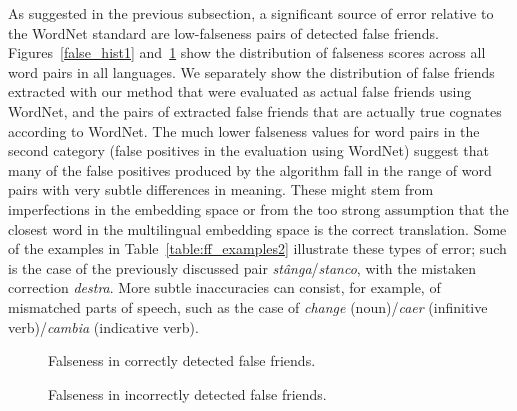\documentclass[output=paper]{langsci/langscibook}
\begin{document}
As suggested in the previous subsection, a significant source of error relative to the WordNet standard are low-falseness pairs of detected false friends.
Figures~\ref{false_hist1} and~\ref{false_hist2} show the distribution of falseness scores across all word pairs in all languages. We separately show the distribution of false friends extracted with our method that were evaluated as actual false friends using WordNet, and the pairs of extracted false friends that are actually true cognates according to WordNet. The much lower falseness values for word pairs in the second category (false positives in the evaluation using WordNet) suggest that many of the false positives produced by the algorithm fall in the range of word pairs with very subtle differences in meaning. These might stem from imperfections in the embedding space or from the too strong assumption that the closest word in the multilingual embedding space is the correct translation. Some of the examples in Table~\ref{table:ff_examples2} illustrate these types of error; such is the case of the previously discussed pair \textit{stânga}\slash\textit{stanco}, with the mistaken correction \textit{destra}. More subtle inaccuracies can consist, for example, of mismatched parts of speech, such as the case of \textit{change} (noun)\slash\textit{caer} (infinitive verb)\slash\textit{cambia} (indicative verb).

\begin{figure}
  \captionsetup{margin=.05\linewidth}
    \begin{floatrow}
                {\caption{Falseness in correctly detected false friends.\label{false_hist1}}}
                {\caption{Falseness in incorrectly detected false friends.\label{false_hist2}}}
    \end{floatrow}
\end{figure}
\end{document}
